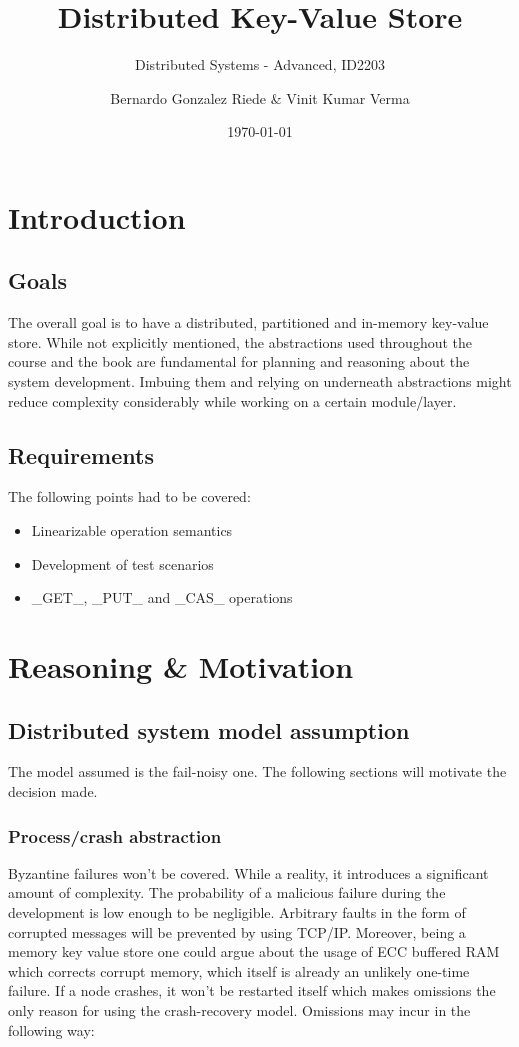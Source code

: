 \documentclass[a4paper]{scrartcl}
\title{Distributed Key-Value Store}
\subtitle{Distributed Systems - Advanced, ID2203}
\author{Bernardo Gonzalez Riede \& Vinit Kumar Verma}
\date{\today}
\begin{document}
\maketitle

\section{Introduction}

\subsection{Goals}
The overall goal is to have a distributed, partitioned and in-memory key-value store. 
While not explicitly mentioned, the abstractions used throughout the course and the book are fundamental for planning and reasoning about the system development. Imbuing them and relying on underneath abstractions might reduce complexity considerably while working on a certain module/layer. 

\subsection{Requirements}
The following points had to be covered:
\begin{itemize}
\item Linearizable operation semantics
\item Development of test scenarios
\item _GET_, _PUT_ and _CAS_ operations
\end{itemize}

\section{Reasoning \& Motivation}

\subsection{Distributed system model assumption}

The model assumed is the fail-noisy one.
The following sections will motivate the decision made.

\subsubsection{Process/crash abstraction}
Byzantine failures won’t be covered. While a reality, it introduces a significant amount of complexity. The probability of a malicious failure during the development is low enough to be negligible. Arbitrary faults in the form of corrupted messages will be prevented by using TCP/IP. Moreover, being a memory key value store one could argue about the usage of ECC buffered RAM which corrects corrupt memory, which itself is already an unlikely one-time failure.
If a node crashes, it won’t be restarted itself which makes omissions the only reason for using the crash-recovery model. Omissions may incur in the following way:
\end{document}
